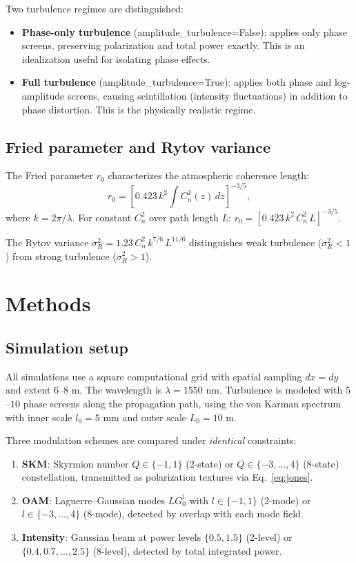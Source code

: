 \documentclass[11pt]{article}
\begin{document}
Two turbulence regimes are distinguished:
\begin{itemize}
\item \textbf{Phase-only turbulence} (amplitude\_turbulence=False):
applies only phase screens, preserving polarization and total power exactly.
This is an idealization useful for isolating phase effects.
\item \textbf{Full turbulence} (amplitude\_turbulence=True):
applies both phase and log-amplitude screens, causing scintillation
(intensity fluctuations) in addition to phase distortion. This is the
physically realistic regime.
\end{itemize}

\subsection{Fried parameter and Rytov variance}

The Fried parameter $r_0$ characterizes the atmospheric coherence length:
\begin{equation}
r_0 = \left[0.423\, k^2 \int C_n^2(z) \, dz\right]^{-3/5},
\label{eq:fried}
\end{equation}
where $k = 2\pi/\lambda$. For constant $C_n^2$ over path length $L$:
$r_0 = [0.423\, k^2\, C_n^2\, L]^{-3/5}$.

The Rytov variance $\sigma_R^2 = 1.23\, C_n^2\, k^{7/6}\, L^{11/6}$
distinguishes weak turbulence ($\sigma_R^2 < 1$) from strong turbulence
($\sigma_R^2 > 1$).

\section{Methods}

\subsection{Simulation setup}

All simulations use a square computational grid with spatial sampling
$dx = dy$ and extent $6$--$8$ m. The wavelength is $\lambda = 1550$ nm.
Turbulence is modeled with $5$--$10$ phase screens along the propagation
path, using the von Karman spectrum with inner scale $l_0 = 5$ mm and outer
scale $L_0 = 10$ m.

Three modulation schemes are compared under \emph{identical} constraints:
\begin{enumerate}
\item \textbf{SKM}: Skyrmion number $Q \in \{-1, 1\}$ (2-state) or
$Q \in \{-3,\dots,4\}$ (8-state) constellation, transmitted as
polarization textures via Eq.~\eqref{eq:jones}.
\item \textbf{OAM}: Laguerre--Gaussian modes $LG_0^l$ with
$l \in \{-1, 1\}$ (2-mode) or $l \in \{-3,\dots,4\}$ (8-mode),
detected by overlap with each mode field.
\item \textbf{Intensity}: Gaussian beam at power levels $\{0.5, 1.5\}$
(2-level) or $\{0.4, 0.7, \dots, 2.5\}$ (8-level), detected by
total integrated power.
\end{enumerate}
\end{document}
